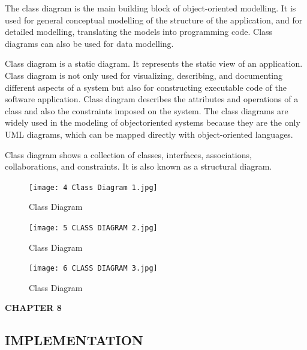 \documentclass[12pt]{article}
\begin{document}
\begin{enumerate}
The class diagram is the main building block of object-oriented modelling. It is used for general conceptual modelling of the structure of the application, and for detailed modelling, translating the models into programming code. Class diagrams can also be used for data modelling.
\par Class diagram is a static diagram. It represents the static view of an application. Class diagram is not only used for visualizing, describing, and documenting different aspects of a system but also for constructing executable code of the software application. Class diagram describes the attributes and operations of a class and also the constraints imposed on the system. The class diagrams are widely used in the modeling of objectoriented systems because they are the only UML diagrams, which can be mapped directly with object-oriented languages.
\par Class diagram shows a collection of classes, interfaces, associations, collaborations, and constraints. It is also known as a structural diagram.

\begin{figure}[h!]
\begin{center}
\texttt{[image: 4 Class Diagram 1.jpg]}
\caption{Class Diagram}
\end{center}
\end{figure}
\newpage

\begin{figure}[h!]
\begin{center}
\texttt{[image: 5 CLASS DIAGRAM 2.jpg]}
\caption{Class Diagram}
\end{center}
\end{figure}


\begin{figure}[h!]
\begin{center}
\texttt{[image: 6 CLASS DIAGRAM 3.jpg]}
\caption{Class Diagram}
\end{center}
\end{figure}



\newpage
\begin{flushleft}\textbf{CHAPTER 8} \end{flushleft}
\begin{flushleft}\section{IMPLEMENTATION} \end{flushleft}
\vspace*{10px}





\end{enumerate}
\end{document}
